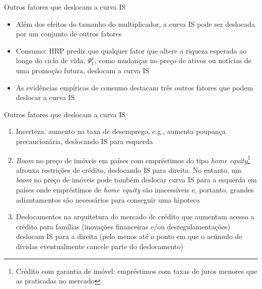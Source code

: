 \documentclass[10pt]{beamer}
\begin{document}
\begin{frame}
    {Outros fatores que deslocam a curva IS}
    \begin{itemize}
        \item Além dos efeitos do tamanho do multiplicador, a curva IS pode ser deslocada por um conjunto de outros fatores\bigskip
        \item Consumo: HRP prediz que qualquer fator que altere a riqueza esperada ao longo do ciclo de vida, $\Psi_t^e$, como mudanças no preço de ativos ou notícias de uma promoção futura, deslocam a curva IS\bigskip
        \item As evidências empíricas de consumo destacam três outros fatores que podem deslocar a curva IS
    \end{itemize}
\end{frame}

\begin{frame}
    {Outros fatores que deslocam a curva IS}
    \begin{enumerate}
        \item Incerteza: aumento na taxa de desemprego, e.g., aumenta poupança precaucionária, deslocando IS para esquerda\medskip
        \item \emph{Boom} no preço de imóveis em países com empréstimos do tipo \emph{home equity}\footnote{Crédito com garantia de imóvel: empréstimos com taxas de juros menores que as praticadas no mercado} afrouxa restrições de crédito, deslocando IS para direita. No entanto, um \emph{boom} no preço de imóveis pode também deslocar curva IS para a esquerda em países onde empréstimos de \emph{home equity} são inacessíveis e, portanto, grandes adiantamentos são necessários para conseguir uma hipoteca\medskip
        \item Deslocamentos na arquitetura do mercado de crédito que aumentam acesso a crédito para famílias (inovações financeiras e/ou desregulamentações) deslocam IS para a direita (pelo menos até o ponto em que o acúmulo de dívidas eventualmente cancele parte do deslocamento)
    \end{enumerate}
\end{frame}
\end{document}
